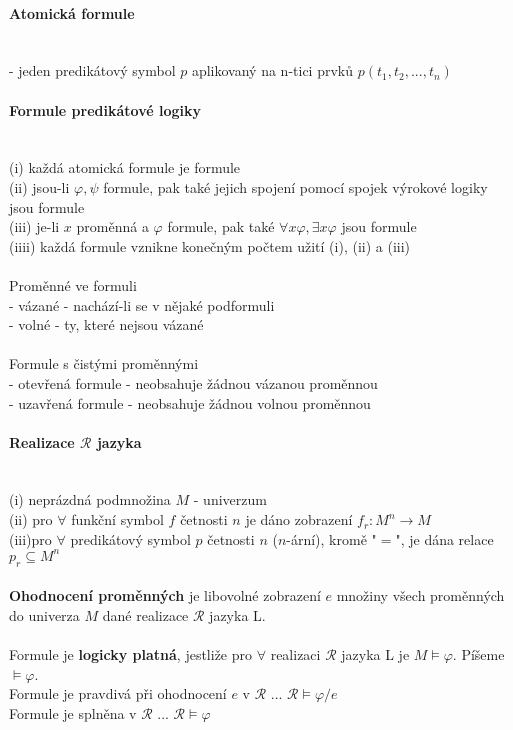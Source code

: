 \paragraph*{Atomická formule} ~\\
- jeden predikátový symbol $p$ aplikovaný na n-tici prvků $p(t_1,t_2,...,t_n)$
\paragraph*{Formule predikátové logiky} ~\\
(i) každá atomická formule je formule\\
(ii) jsou-li $\varphi , \psi$ formule, pak také jejich spojení pomocí spojek výrokové logiky jsou formule\\
(iii) je-li $x$ proměnná a $ \varphi $ formule, pak také $\forall x \varphi , \exists x \varphi$ jsou formule\\
(iiii) každá formule vznikne konečným počtem užití (i), (ii) a (iii)\\~\\
%
Proměnné ve formuli\\
- vázané - nachází-li se v nějaké podformuli\\
- volné - ty, které nejsou vázané\\~\\
%
Formule s čistými proměnnými\\
- otevřená formule - neobsahuje žádnou vázanou proměnnou\\
- uzavřená formule - neobsahuje žádnou volnou proměnnou

\paragraph*{Realizace $ \mathcal{R} $ jazyka} ~\\
(i) neprázdná podmnožina $M$ - univerzum\\
(ii) pro $\forall $ funkční symbol $f$ četnosti $n$ je dáno zobrazení $f_r : M^n \rightarrow M$\\
(iii)pro $\forall $ predikátový symbol $p$ četnosti $n$ ($n$-ární), kromě "$=$", je dána relace $p_r \subseteq M^n$\\~\\
%
\textbf{Ohodnocení proměnných} je libovolné zobrazení $e$ množiny všech proměnných do univerza $M$ dané realizace $\mathcal{R} $ jazyka L.\\~\\
%
Formule je \textbf{logicky platná}, jestliže pro $\forall $ realizaci $\mathcal{R} $ jazyka L je $M \models \varphi $. Píšeme $\models \varphi $.\\
Formule je pravdivá při ohodnocení $e$ v $\mathcal{R} $ ... $\mathcal{R} \models \varphi / e$\\
Formule je splněna v $\mathcal{R} $ ... $\mathcal{R} \models \varphi $

